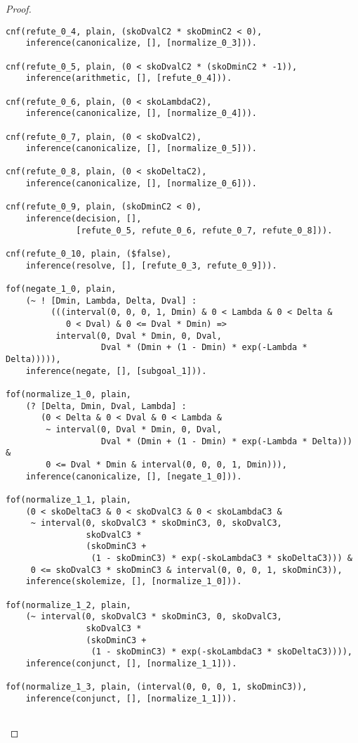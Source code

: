 \begin{proof}
\begin{verbatim}
cnf(refute_0_4, plain, (skoDvalC2 * skoDminC2 < 0),
    inference(canonicalize, [], [normalize_0_3])).

cnf(refute_0_5, plain, (0 < skoDvalC2 * (skoDminC2 * -1)),
    inference(arithmetic, [], [refute_0_4])).

cnf(refute_0_6, plain, (0 < skoLambdaC2),
    inference(canonicalize, [], [normalize_0_4])).

cnf(refute_0_7, plain, (0 < skoDvalC2),
    inference(canonicalize, [], [normalize_0_5])).

cnf(refute_0_8, plain, (0 < skoDeltaC2),
    inference(canonicalize, [], [normalize_0_6])).

cnf(refute_0_9, plain, (skoDminC2 < 0),
    inference(decision, [],
              [refute_0_5, refute_0_6, refute_0_7, refute_0_8])).

cnf(refute_0_10, plain, ($false),
    inference(resolve, [], [refute_0_3, refute_0_9])).

fof(negate_1_0, plain,
    (~ ! [Dmin, Lambda, Delta, Dval] :
         (((interval(0, 0, 0, 1, Dmin) & 0 < Lambda & 0 < Delta &
            0 < Dval) & 0 <= Dval * Dmin) =>
          interval(0, Dval * Dmin, 0, Dval,
                   Dval * (Dmin + (1 - Dmin) * exp(-Lambda * Delta))))),
    inference(negate, [], [subgoal_1])).

fof(normalize_1_0, plain,
    (? [Delta, Dmin, Dval, Lambda] :
       (0 < Delta & 0 < Dval & 0 < Lambda &
        ~ interval(0, Dval * Dmin, 0, Dval,
                   Dval * (Dmin + (1 - Dmin) * exp(-Lambda * Delta))) &
        0 <= Dval * Dmin & interval(0, 0, 0, 1, Dmin))),
    inference(canonicalize, [], [negate_1_0])).

fof(normalize_1_1, plain,
    (0 < skoDeltaC3 & 0 < skoDvalC3 & 0 < skoLambdaC3 &
     ~ interval(0, skoDvalC3 * skoDminC3, 0, skoDvalC3,
                skoDvalC3 *
                (skoDminC3 +
                 (1 - skoDminC3) * exp(-skoLambdaC3 * skoDeltaC3))) &
     0 <= skoDvalC3 * skoDminC3 & interval(0, 0, 0, 1, skoDminC3)),
    inference(skolemize, [], [normalize_1_0])).

fof(normalize_1_2, plain,
    (~ interval(0, skoDvalC3 * skoDminC3, 0, skoDvalC3,
                skoDvalC3 *
                (skoDminC3 +
                 (1 - skoDminC3) * exp(-skoLambdaC3 * skoDeltaC3)))),
    inference(conjunct, [], [normalize_1_1])).

fof(normalize_1_3, plain, (interval(0, 0, 0, 1, skoDminC3)),
    inference(conjunct, [], [normalize_1_1])).


\end{verbatim}
\end{proof}
